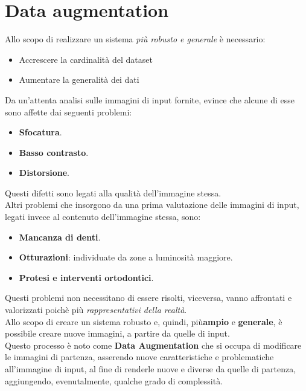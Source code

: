 \documentclass[12pt,a4paper,openright,twoside]{book}
\begin{document}
\section{Data augmentation}
Allo scopo di realizzare un sistema {\itshape più robusto e generale} è necessario:
\begin{itemize}
\item Accrescere la cardinalità del dataset
\item Aumentare la generalità dei dati
\end{itemize}
Da un'attenta analisi sulle immagini di input fornite, evince che alcune di esse sono affette dai seguenti problemi:
\begin{itemize}
\item \textbf{Sfocatura}.
\item \textbf{Basso contrasto}.
\item \textbf{Distorsione}.
\end{itemize}
Questi difetti sono legati alla qualità dell'immagine stessa.\\
Altri problemi che insorgono da una prima valutazione delle immagini di input, legati invece al contenuto dell'immagine stessa, sono:
\begin{itemize}
\item \textbf{Mancanza di denti}.
\item \textbf{Otturazioni}: individuate da zone a luminosità maggiore.
\item \textbf{Protesi e interventi ortodontici}.
\end{itemize}
Questi problemi non necessitano di essere risolti, viceversa, vanno affrontati e valorizzati poichè più {\itshape rappresentativi della realtà}.\\

Allo scopo di creare un sistema  robusto e, quindi, più\textbf{ampio} e \textbf{generale}, è possibile creare nuove immagini, a partire da quelle di input.\\
Questo processo è noto come \textbf{Data Augmentation} che si occupa di modificare le immagini di partenza, asserendo nuove caratteristiche e problematiche all'immagine di input, al fine di renderle nuove e diverse da quelle di partenza, aggiungendo, evenutalmente, qualche grado di complessità.\\
\end{document}
